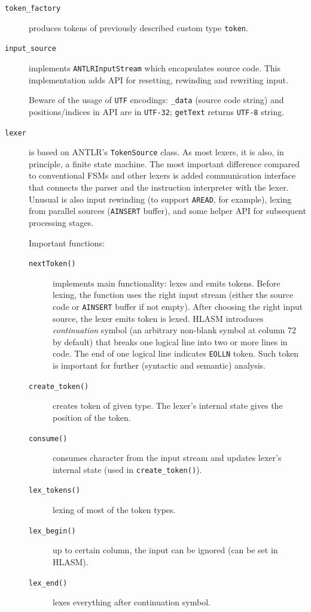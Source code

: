 \begin{description}
	\item[\texttt{token\_factory}] produces tokens of previously described custom type \texttt{token}.
	
	\item[\texttt{input\_source}] implements \texttt{ANTLRInputStream} which encapsulates source code. This implementation adds API for resetting, rewinding and rewriting input. 
	
	Beware of the usage of \texttt{UTF} encodings: \texttt{\_data} (source code string) and positions/indices in API are in \texttt{UTF-32}; \texttt{getText} returns \texttt{UTF-8} string.
	
	\item[\texttt{lexer}] is based on ANTLR's \texttt{TokenSource} class. As most lexers, it is also, in principle, a finite state machine. The most important difference compared to conventional FSMs and other lexers is added communication interface that connects the parser and the instruction interpreter with the lexer. Unusual is also input rewinding (to support \texttt{AREAD}, for example), lexing from parallel sources (\texttt{AINSERT} buffer), and some helper API for subsequent processing stages.
	
	Important functions:
	
	\begin{description}
		\item[\texttt{nextToken()}] implements main functionality: lexes and emits tokens. Before lexing, the function uses the right input stream (either the source code or \texttt{AINSERT} buffer if not empty). After choosing the right input source, the lexer emits token is lexed. HLASM introduces \textit{continuation} symbol (an arbitrary non-blank symbol at column 72 by default) that breaks one logical line into two or more lines in code. The end of one logical line indicates \texttt{EOLLN} token. Such token is important for further (syntactic and semantic) analysis.
		
		
		\item[\texttt{create\_token()}] creates token of given type. The lexer's internal state gives the position of the token. 
		
		\item[\texttt{consume()}] consumes character from the input stream and updates lexer's internal state (used in \texttt{create\_token()}).
		
		\item[\texttt{lex\_tokens()}] lexing of most of the token types.
		
		\item[\texttt{lex\_begin()}] up to certain column, the input can be ignored (can be set in HLASM).
		
		\item[\texttt{lex\_end()}] lexes everything after continuation symbol.
		
		
	\end{description}
	
\end{description}


